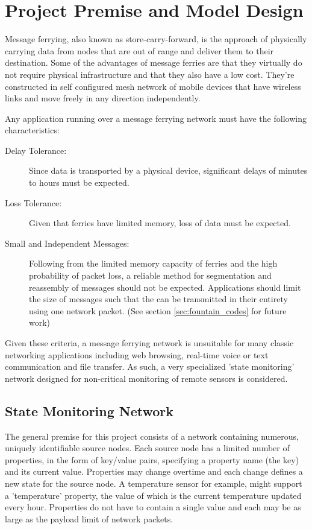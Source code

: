 \chapter{Project Premise and Model Design} 



Message ferrying, also known as store-carry-forward, is the approach of physically carrying data from nodes that are out of range and deliver them to their destination. 
Some of the advantages of message ferries are that they virtually do not require physical infrastructure and that they also have a low cost. 
They're constructed in self configured mesh network of mobile devices that have wireless links and
move freely in any direction independently. 
	


Any application running over a message ferrying network must have the following characteristics:

\begin{description}
\item[Delay Tolerance: ]
Since data is transported by a physical device, significant delays of minutes to hours must be expected.
\item[Loss Tolerance: ]
Given that ferries have limited memory, loss of data must be expected.
\item[Small and Independent Messages: ]
Following from the limited memory capacity of ferries and the high probability of packet loss, a reliable method for segmentation and reassembly of messages should not be expected. 
Applications should limit the size of messages such that the can be transmitted in their entirety using one network packet.
(See section \ref{sec:fountain_codes} for future work)
\end{description}

Given these criteria, a message ferrying network is unsuitable for many classic networking applications including web browsing, real-time voice or text communication and file transfer.
As such, a very specialized 'state monitoring' network designed for non-critical monitoring of remote sensors is considered.

\section{State Monitoring Network}

The general premise for this project consists of a network containing numerous, uniquely identifiable source nodes. 
Each source node has a limited number of properties, in the form of key/value pairs, specifying a property name (the key) and its current value.
Properties may change overtime and each change defines a new state for the source node.
A temperature sensor for example, might support a 'temperature' property, the value of which is the current temperature updated every hour.
Properties do not have to contain a single value and each may be as large as the payload limit of network packets. %

